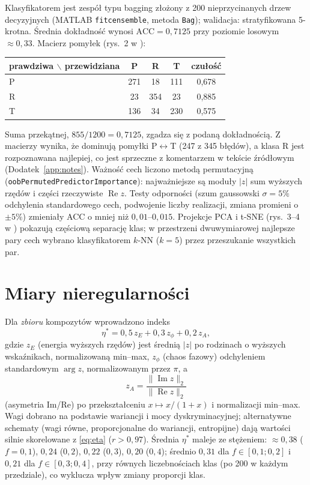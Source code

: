 \documentclass[12pt,a4paper,twoside,openright]{report}
\theoremstyle{definition}
\theoremstyle{remark}
\renewcommand{\Re}{\operatorname{Re}}
\renewcommand{\Im}{\operatorname{Im}}
\begin{document}
Klasyfikatorem jest zespół typu bagging złożony z 200 nieprzycinanych drzew decyzyjnych (MATLAB \texttt{fitcensemble}, metoda \texttt{Bag}); walidacja: stratyfikowana 5-krotna. Średnia dokładność wynosi $\mathrm{ACC}=0{,}7125$ przy poziomie losowym $\approx0{,}33$. Macierz pomyłek (rys.~2 w \cite{mityushev2025computationalpart3}):
\begin{center}\small
\begin{tabular}{@{}l|ccc|c@{}}
\toprule
prawdziwa $\backslash$ przewidziana & P & R & T & czułość\\ \midrule
P & 271 & 18 & 111 & 0,678\\
R & 23 & 354 & 23 & 0,885\\
T & 136 & 34 & 230 & 0,575\\ \bottomrule
\end{tabular}
\end{center}
Suma przekątnej, $855/1200=0{,}7125$, zgadza się z podaną dokładnością. Z macierzy wynika, że dominują pomyłki P$\leftrightarrow$T (247 z 345 błędów), a klasa R jest rozpoznawana najlepiej, co jest sprzeczne z komentarzem w tekście źródłowym (Dodatek~\ref{app:notes}). Ważność cech liczono metodą permutacyjną (\texttt{oobPermutedPredictorImportance}): najważniejsze są moduły $|z|$ sum wyższych rzędów i części rzeczywiste $\Re z$. Testy odporności (szum gaussowski $\sigma=5\%$ odchylenia standardowego cech, podwojenie liczby realizacji, zmiana promieni o $\pm5\%$) zmieniały ACC o mniej niż $0{,}01$--$0{,}015$. Projekcje PCA i t-SNE (rys.~3--4 w \cite{mityushev2025computationalpart3}) pokazują częściową separację klas; w przestrzeni dwuwymiarowej najlepsze pary cech wybrano klasyfikatorem $k$-NN ($k=5$) przez przeszukanie wszystkich par.

\section{Miary nieregularności}

Dla \emph{zbioru} kompozytów wprowadzono indeks
\begin{equation}\label{eq:eta}
\eta^*=0{,}5\,z_E+0{,}3\,z_\phi+0{,}2\,z_A,
\end{equation}
gdzie $z_E$ (energia wyższych rzędów) jest średnią $|z|$ po rodzinach o wyższych wskaźnikach, normalizowaną min--max, $z_\phi$ (chaos fazowy) odchyleniem standardowym $\arg z$, normalizowanym przez $\pi$, a
\begin{equation}
z_A=\frac{\|\Im z\|_2}{\|\Re z\|_2}
\end{equation}
(asymetria Im/Re) po przekształceniu $x\mapsto x/(1+x)$ i normalizacji min--max. Wagi dobrano na podstawie wariancji i mocy dyskryminacyjnej; alternatywne schematy (wagi równe, proporcjonalne do wariancji, entropijne) dają wartości silnie skorelowane z \eqref{eq:eta} ($r>0{,}97$). Średnia $\eta^*$ maleje ze stężeniem: $\approx0{,}38$ ($f=0{,}1$), $0{,}24$ ($0{,}2$), $0{,}22$ ($0{,}3$), $0{,}20$ ($0{,}4$); średnio $0{,}31$ dla $f\in[0{,}1;0{,}2]$ i $0{,}21$ dla $f\in[0{,}3;0{,}4]$, przy równych liczebnościach klas (po 200 w każdym przedziale), co wyklucza wpływ zmiany proporcji klas.
\end{document}
